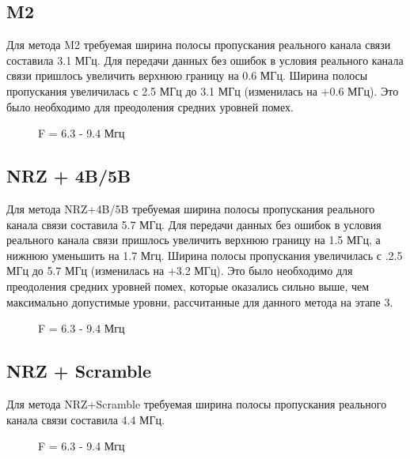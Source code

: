 \thispagestyle{empty}


\subsection{M2}

Для метода M2 требуемая ширина полосы пропускания реального канала связи составила 3.1 МГц.
Для передачи данных без ошибок в условия реального канала связи пришлось увеличить верхнюю границу на 0.6 МГц. Ширина полосы пропускания увеличилась с 2.5 МГц до 3.1 МГц (изменилась на +0.6 МГц). Это было необходимо для преодоления средних уровней помех.

\vspace{0.4cm}
\begin{figure}[H]
	\centering
	\caption{F =  6.3 - 9.4 Мгц}
\end{figure}

\vspace{1.5cm}
\subsection{NRZ + 4B/5B}

Для метода NRZ+4B/5B требуемая ширина полосы пропускания реального канала связи составила 5.7 МГц.
Для передачи данных без ошибок в условия реального канала связи пришлось увеличить верхнюю границу на 1.5 МГц, а нижнюю уменьшить на 1.7 Мгц. Ширина полосы пропускания увеличилась с .2.5 МГц до 5.7 МГц (изменилась на +3.2 МГц). Это было необходимо для преодоления средних уровней помех, которые оказались сильно выше, чем максимально допустимые уровни, рассчитанные для данного метода на этапе 3.

\vspace{0.4cm}
\begin{figure}[H]
	\centering
	\caption{F =  6.3 - 9.4 Мгц}
\end{figure}

\subsection{NRZ + Scramble}

Для метода NRZ+Scramble требуемая ширина полосы пропускания реального канала связи составила 4.4 МГц.

\vspace{0.4cm}
\begin{wrapfigure}{r}{0.6\textwidth}
	\centering
	\caption{F =  6.3 - 9.4 Мгц}
	\vspace{-1.7cm}
\end{wrapfigure}

